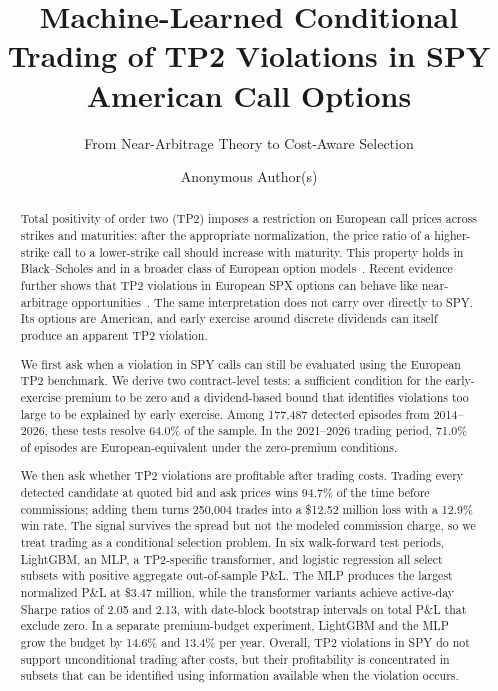 \documentclass[sigconf,review,anonymous]{acmart}
\begin{document}
\title{Machine-Learned Conditional Trading of TP2 Violations in SPY American Call Options}
\subtitle{From Near-Arbitrage Theory to Cost-Aware Selection}

\author{Anonymous Author(s)}

\renewcommand{\shortauthors}{Anonymous et al.}

\begin{abstract}
Total positivity of order two (TP2) imposes a restriction on European call prices across strikes and maturities: after the appropriate normalization, the price ratio of a higher-strike call to a lower-strike call should increase with maturity. This property holds in Black--Scholes and in a broader class of European option models~\cite{glasserman2026tp2theory}. Recent evidence further shows that TP2 violations in European SPX options can behave like near-arbitrage opportunities~\cite{glasserman2025tp2}. The same interpretation does not carry over directly to SPY. Its options are American, and early exercise around discrete dividends can itself produce an apparent TP2 violation.

We first ask when a violation in SPY calls can still be evaluated using the European TP2 benchmark. We derive two contract-level tests: a sufficient condition for the early-exercise premium to be zero and a dividend-based bound that identifies violations too large to be explained by early exercise. Among 177{,}487 detected episodes from 2014--2026, these tests resolve 64.0\% of the sample. In the 2021--2026 trading period, 71.0\% of episodes are European-equivalent under the zero-premium conditions.

We then ask whether TP2 violations are profitable after trading costs. Trading every detected candidate at quoted bid and ask prices wins 94.7\% of the time before commissions; adding them turns 250{,}004 trades into a \$12.52 million loss with a 12.9\% win rate. The signal survives the spread but not the modeled commission charge, so we treat trading as a conditional selection problem. In six walk-forward test periods, LightGBM, an MLP, a TP2-specific transformer, and logistic regression all select subsets with positive aggregate out-of-sample P\&L. The MLP produces the largest normalized P\&L at \$3.47 million, while the transformer variants achieve active-day Sharpe ratios of 2.05 and 2.13, with date-block bootstrap intervals on total P\&L that exclude zero. In a separate premium-budget experiment, LightGBM and the MLP grow the budget by 14.6\% and 13.4\% per year. Overall, TP2 violations in SPY do not support unconditional trading after costs, but their profitability is concentrated in subsets that can be identified using information available when the violation occurs.
\end{abstract}
\end{document}
